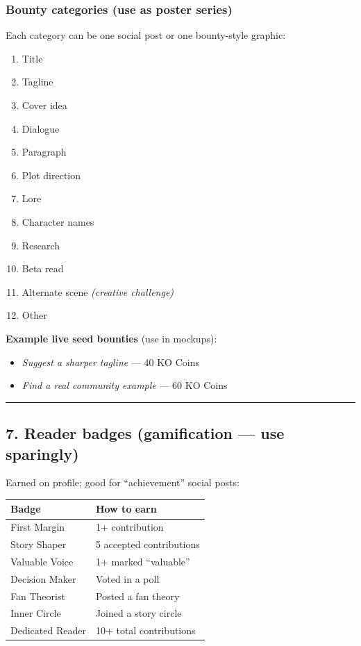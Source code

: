\documentclass[11pt,a4paper]{report}
\begin{document}
\subsubsection{Bounty categories (use as poster series)}

Each category can be one social post or one bounty-style graphic:


\begin{enumerate}
  \item Title
  \item Tagline
  \item Cover idea
  \item Dialogue
  \item Paragraph
  \item Plot direction
  \item Lore
  \item Character names
  \item Research
  \item Beta read
  \item Alternate scene \textit{(creative challenge)}
  \item Other
\end{enumerate}

\textbf{Example live seed bounties} (use in mockups):

\begin{itemize}
  \item \textit{Suggest a sharper tagline} --- 40 KO Coins
  \item \textit{Find a real community example} --- 60 KO Coins
\end{itemize}

\medskip\hrule\medskip

\subsection{7. Reader badges (gamification --- use sparingly)}

Earned on profile; good for “achievement” social posts:


\begin{longtable}{|l|l|}
\hline
Badge & How to earn \\ \hline
First Margin & 1+ contribution \\ \hline
Story Shaper & 5 accepted contributions \\ \hline
Valuable Voice & 1+ marked “valuable” \\ \hline
Decision Maker & Voted in a poll \\ \hline
Fan Theorist & Posted a fan theory \\ \hline
Inner Circle & Joined a story circle \\ \hline
Dedicated Reader & 10+ total contributions \\
\hline
\end{longtable}
\end{document}
